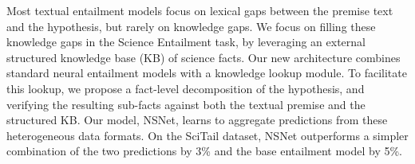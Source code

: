 Most textual entailment models focus on lexical gaps between the premise text and the hypothesis, but rarely on knowledge gaps. We focus on filling these knowledge gaps in the Science Entailment task, by leveraging an external structured knowledge base (KB) of science facts. Our new architecture combines standard neural entailment models with a knowledge lookup module. To facilitate this lookup, we propose a fact-level decomposition of the hypothesis, and verifying the resulting sub-facts against both the textual premise and the structured KB. Our model, NSNet, learns to aggregate predictions from these heterogeneous data formats. On the SciTail dataset, NSNet outperforms a simpler combination of the two predictions by 3\% and the base entailment model by 5\%.
